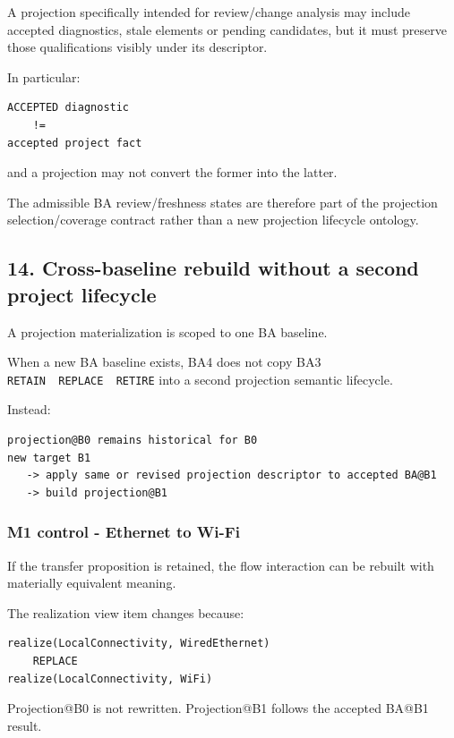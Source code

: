 \documentclass[11pt,a4paper]{article}
\begin{document}
A projection specifically intended for review/change analysis may include accepted diagnostics, stale elements or pending candidates, but it must preserve those qualifications visibly under its descriptor.

In particular:

\begin{verbatim}
ACCEPTED diagnostic
    !=
accepted project fact
\end{verbatim}

and a projection may not convert the former into the latter.

The admissible BA review/freshness states are therefore part of the projection selection/coverage contract rather than a new projection lifecycle ontology.

\subsection{14. Cross-baseline rebuild without a second project lifecycle}\label{14-cross-baseline-rebuild-without-a-second-project-lifecycle}

A projection materialization is scoped to one BA baseline.

When a new BA baseline exists, BA4 does not copy BA3 \texttt{RETAIN\ \textbar{}\ REPLACE\ \textbar{}\ RETIRE} into a second projection semantic lifecycle.

Instead:

\begin{verbatim}
projection@B0 remains historical for B0
new target B1
   -> apply same or revised projection descriptor to accepted BA@B1
   -> build projection@B1
\end{verbatim}

\subsubsection{M1 control - Ethernet to Wi-Fi}\label{m1-control---ethernet-to-wi-fi}

If the transfer proposition is retained, the flow interaction can be rebuilt with materially equivalent meaning.

The realization view item changes because:

\begin{verbatim}
realize(LocalConnectivity, WiredEthernet)
    REPLACE
realize(LocalConnectivity, WiFi)
\end{verbatim}

Projection@B0 is not rewritten. Projection@B1 follows the accepted BA@B1 result.
\end{document}
